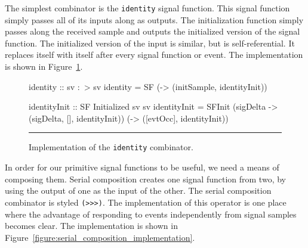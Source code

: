 The simplest combinator is the {\tt identity} signal function. This signal
function simply passes all of its inputs along as outputs. The initialization
function simply passes along the received sample and outputs the initialized
version of the signal function. The initialized version of the input is similar,
but is self-referential. It replaces itself with itself after every signal
function or event. The implementation is shown in Figure~\ref{figure:identity_implementation}.

\begin{figure}
\begin{code}
identity :: sv :~> sv
identity =
  SF (\initSample -> (initSample, identityInit))

identityInit :: SF Initialized sv sv
identityInit =
  SFInit (\dt sigDelta -> (sigDelta, [], identityInit))
         (\evtOcc -> ([evtOcc], identityInit))
\end{code}
\hrule
\caption{Implementation of the {\tt identity} combinator.}
\label{figure:identity_implementation}
\end{figure}

In order for our primitive signal functions to be useful, we need a means of
composing them. Serial composition creates one signal function from two, by
using the output of one as the input of the other. The serial composition
combinator is styled {\tt (>>>)}. The implementation of this operator is one
place where the advantage of responding to events independently from signal
samples becomes clear. The implementation is shown in Figure~\ref{figure:serial_composition_implementation}.

